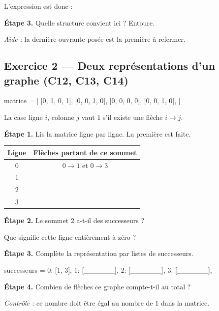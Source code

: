 \medskip
L'expression est donc :  \qquad {}

\bigskip

\textbf{Étape 3.} Quelle structure convient ici ? Entoure.

\medskip
\begin{center}
 \qquad {}
\end{center}

\medskip
\textit{Aide :} la dernière ouvrante posée est la première à refermer.

\bigskip
\bigskip

\subsection*{Exercice 2 --- Deux représentations d'un graphe (C12, C13, C14)}

\begin{python}
matrice = [
    [0, 1, 0, 1],
    [0, 0, 1, 0],
    [0, 0, 0, 0],
    [0, 0, 1, 0],
]
\end{python}

\medskip
La case ligne $i$, colonne $j$ vaut $1$ s'il existe une flèche $i \rightarrow j$.

\bigskip

\textbf{Étape 1.} Lis la matrice ligne par ligne. La première est faite.

\bigskip

\begin{center}
\begin{tabular}{|c|c|}
\hline
\textbf{Ligne} & \textbf{Flèches partant de ce sommet} \\
\hline
$0$ & $0 \rightarrow 1$ \quad et \quad $0 \rightarrow 3$ \\
\hline
$1$ & \dotfill \\
\hline
$2$ & \dotfill \\
\hline
$3$ & \dotfill \\
\hline
\end{tabular}
\end{center}

\bigskip

\textbf{Étape 2.} Le sommet $2$ a-t-il des successeurs ?

\medskip
\begin{center}
 \qquad {}
\end{center}

\medskip
Que signifie cette ligne entièrement à zéro ? \dotfill

\bigskip

\textbf{Étape 3.} Complète la représentation par listes de successeurs.

\begin{python}
successeurs = {
    0: [1, 3],
    1: [______],
    2: [______],
    3: [______],
}
\end{python}

\bigskip

\textbf{Étape 4.} Combien de flèches ce graphe compte-t-il au total ?

\medskip
\dotfill

\medskip
\textit{Contrôle :} ce nombre doit être égal au nombre de $1$ dans la matrice.
